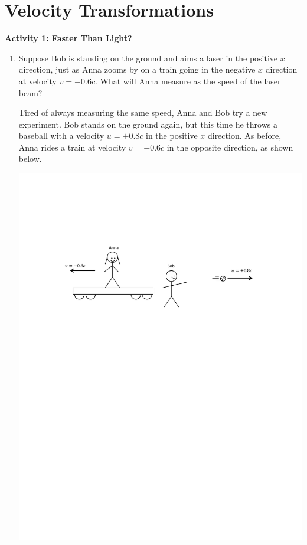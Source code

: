 \section{Velocity Transformations}


\makelabheader %

\bigskip

\textbf{Activity 1: Faster Than Light?}

\begin{enumerate}[labparts]
\item Suppose Bob is standing on the ground and aims a laser in the positive $x$ direction, just as Anna zooms by on a train going in the negative $x$ direction at velocity $v=-0.6c$.  What will Anna measure as the speed of the laser beam?
\answerspace{0.5in}

Tired of always measuring the same speed, Anna and Bob try a new experiment.  Bob stands on the ground again, but this time he throws a baseball with a velocity $u=+0.8c$ in the positive $x$ direction.  As before, Anna rides a train at velocity $v=-0.6c$ in the opposite direction, as shown below.

\begin{center}
\includegraphics{velocity_transformations/baseball1.pdf}
\end{center}


\end{enumerate}
